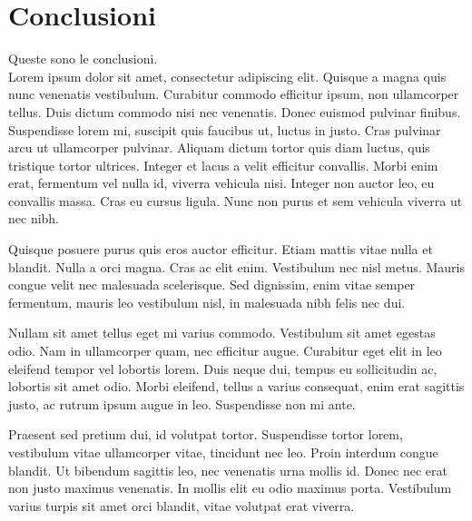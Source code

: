 \clearpage{\pagestyle{empty}\cleardoublepage}
\chapter*{Conclusioni}
 Queste sono le
conclusioni.\\

Lorem ipsum dolor sit amet, consectetur adipiscing elit. Quisque a magna quis nunc venenatis vestibulum. Curabitur commodo efficitur ipsum, non ullamcorper tellus. Duis dictum commodo nisi nec venenatis. Donec euismod pulvinar finibus. Suspendisse lorem mi, suscipit quis faucibus ut, luctus in justo. Cras pulvinar arcu ut ullamcorper pulvinar. Aliquam dictum tortor quis diam luctus, quis tristique tortor ultrices. Integer et lacus a velit efficitur convallis. Morbi enim erat, fermentum vel nulla id, viverra vehicula nisi. Integer non auctor leo, eu convallis massa. Cras eu cursus ligula. Nunc non purus et sem vehicula viverra ut nec nibh.

Quisque posuere purus quis eros auctor efficitur. Etiam mattis vitae nulla et blandit. Nulla a orci magna. Cras ac elit enim. Vestibulum nec nisl metus. Mauris congue velit nec malesuada scelerisque. Sed dignissim, enim vitae semper fermentum, mauris leo vestibulum nisl, in malesuada nibh felis nec dui.

Nullam sit amet tellus eget mi varius commodo. Vestibulum sit amet egestas odio. Nam in ullamcorper quam, nec efficitur augue. Curabitur eget elit in leo eleifend tempor vel lobortis lorem. Duis neque dui, tempus eu sollicitudin ac, lobortis sit amet odio. Morbi eleifend, tellus a varius consequat, enim erat sagittis justo, ac rutrum ipsum augue in leo. Suspendisse non mi ante.

Praesent sed pretium dui, id volutpat tortor. Suspendisse tortor lorem, vestibulum vitae ullamcorper vitae, tincidunt nec leo. Proin interdum congue blandit. Ut bibendum sagittis leo, nec venenatis urna mollis id. Donec nec erat non justo maximus venenatis. In mollis elit eu odio maximus porta. Vestibulum varius turpis sit amet orci blandit, vitae volutpat erat viverra.


